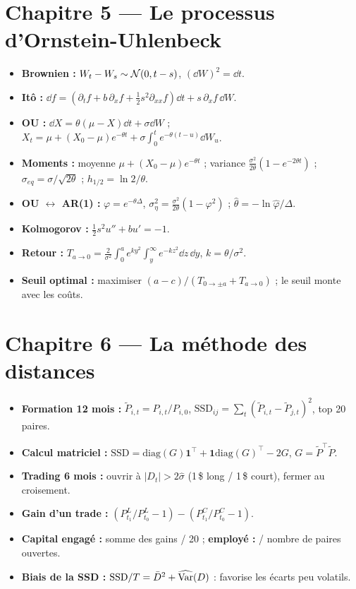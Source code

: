 \section*{Chapitre 5 — Le processus d'Ornstein-Uhlenbeck}
\begin{itemize}[leftmargin=1.2em,itemsep=0.05em]
\item \textbf{Brownien :} $W_t - W_s\sim\mathcal{N}(0,t-s)$, $(\dd W)^2 = \dd t$.
\item \textbf{Itô :} $\dd f = (\partial_tf + b\,\partial_xf + \frac12s^2\partial_{xx}f)\dd t + s\,\partial_xf\,\dd W$.
\item \textbf{OU :} $\dd X = \theta(\mu - X)\dd t + \sigma\dd W$ ; $X_t = \mu + (X_0-\mu)e^{-\theta t} + \sigma\int_0^te^{-\theta(t-u)}\dd W_u$.
\item \textbf{Moments :} moyenne $\mu + (X_0-\mu)e^{-\theta t}$ ; variance $\frac{\sigma^2}{2\theta}(1-e^{-2\theta t})$ ; $\sigma_{eq} = \sigma/\sqrt{2\theta}$ ; $h_{1/2} = \ln2/\theta$.
\item \textbf{OU $\leftrightarrow$ AR(1) :} $\varphi = e^{-\theta\Delta}$, $\sigma_\eta^2 = \frac{\sigma^2}{2\theta}(1-\varphi^2)$ ; $\hat\theta = -\ln\hat\varphi/\Delta$.
\item \textbf{Kolmogorov :} $\frac12s^2u'' + bu' = -1$.
\item \textbf{Retour :} $T_{a\to0} = \frac2{\sigma^2}\int_0^ae^{ky^2}\int_y^\infty e^{-kz^2}\dd z\,\dd y$, $k=\theta/\sigma^2$.
\item \textbf{Seuil optimal :} maximiser $(a-c)/(T_{0\to\pm a}+T_{a\to0})$ ; le seuil monte avec les coûts.
\end{itemize}

\section*{Chapitre 6 — La méthode des distances}
\begin{itemize}[leftmargin=1.2em,itemsep=0.05em]
\item \textbf{Formation 12 mois :} $\tilde P_{i,t} = P_{i,t}/P_{i,0}$, $\mathrm{SSD}_{ij} = \sum_t(\tilde P_{i,t}-\tilde P_{j,t})^2$, top 20 paires.
\item \textbf{Calcul matriciel :} $\mathrm{SSD} = \mathrm{diag}(G)\mathbf 1^\top + \mathbf 1\mathrm{diag}(G)^\top - 2G$, $G = \tilde P^\top\tilde P$.
\item \textbf{Trading 6 mois :} ouvrir à $|D_t| > 2\hat\sigma$ (1\,\$ long / 1\,\$ court), fermer au croisement.
\item \textbf{Gain d'un trade :} $(P^L_{t_1}/P^L_{t_0}-1) - (P^C_{t_1}/P^C_{t_0}-1)$.
\item \textbf{Capital engagé :} somme des gains / 20 ; \textbf{employé :} / nombre de paires ouvertes.
\item \textbf{Biais de la SSD :} $\mathrm{SSD}/T = \bar D^2 + \widehat{\operatorname{Var}}(D)$ : favorise les écarts peu volatils.
\end{itemize}

